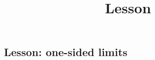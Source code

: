 \documentclass{ximera}
\title{Lesson}
\begin{document}
\maketitle

\subsection{Lesson: one-sided limits}

\begin{center}
\end{center}
\end{document}

